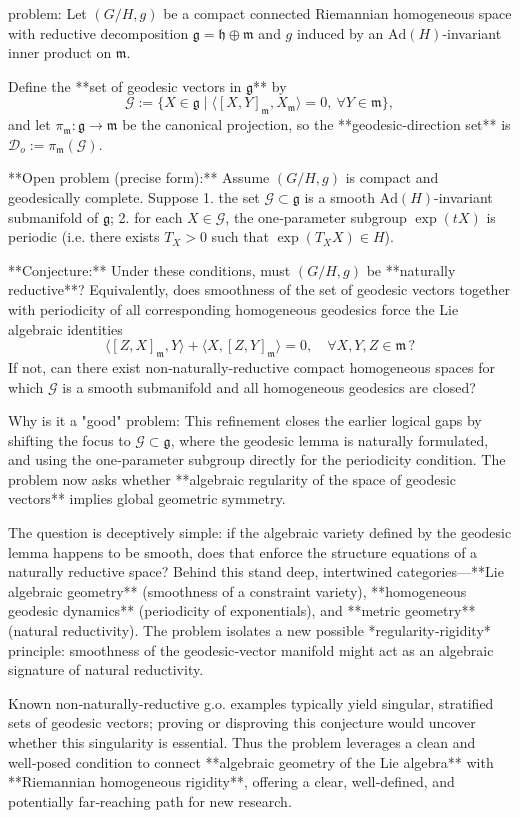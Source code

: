 problem:  
Let \( (G/H,g) \) be a compact connected Riemannian homogeneous space with reductive decomposition \( \mathfrak g = \mathfrak h \oplus \mathfrak m \) and \( g \) induced by an \( \mathrm{Ad}(H) \)-invariant inner product on \( \mathfrak m \).  

Define the **set of geodesic vectors in \(\mathfrak g\)** by  
\[
\mathcal{G} := \{ X\in \mathfrak g \mid \langle [X, Y]_{\mathfrak m}, X_{\mathfrak m}\rangle = 0,\ \forall Y\in \mathfrak m \},
\]
and let \(\pi_{\mathfrak m} : \mathfrak g \to \mathfrak m\) be the canonical projection, so the **geodesic‑direction set** is \(\mathcal{D}_o := \pi_{\mathfrak m}(\mathcal{G})\).  

**Open problem (precise form):**  
Assume \( (G/H,g) \) is compact and geodesically complete. Suppose  
1. the set \(\mathcal{G}\subset \mathfrak g\) is a smooth \(\mathrm{Ad}(H)\)-invariant submanifold of \(\mathfrak g\);  
2. for each \(X\in \mathcal{G}\), the one‑parameter subgroup \(\exp(tX)\) is periodic (i.e. there exists \(T_X>0\) such that \(\exp(T_X X)\in H\)).  

**Conjecture:**  
Under these conditions, must \( (G/H,g) \) be **naturally reductive**?  
Equivalently, does smoothness of the set of geodesic vectors together with periodicity of all corresponding homogeneous geodesics force the Lie algebraic identities  
\[
\langle [Z, X]_{\mathfrak m}, Y\rangle + \langle X, [Z,Y]_{\mathfrak m}\rangle = 0,\quad \forall X,Y,Z\in \mathfrak m\,?
\]
If not, can there exist non‑naturally‑reductive compact homogeneous spaces for which \(\mathcal{G}\) is a smooth submanifold and all homogeneous geodesics are closed?

Why is it a "good" problem:  
This refinement closes the earlier logical gaps by shifting the focus to \( \mathcal G\subset \mathfrak g\), where the geodesic lemma is naturally formulated, and using the one‑parameter subgroup directly for the periodicity condition. The problem now asks whether **algebraic regularity of the space of geodesic vectors** implies global geometric symmetry.  

The question is deceptively simple: if the algebraic variety defined by the geodesic lemma happens to be smooth, does that enforce the structure equations of a naturally reductive space? Behind this stand deep, intertwined categories—**Lie algebraic geometry** (smoothness of a constraint variety), **homogeneous geodesic dynamics** (periodicity of exponentials), and **metric geometry** (natural reductivity). The problem isolates a new possible *regularity‑rigidity* principle: smoothness of the geodesic‑vector manifold might act as an algebraic signature of natural reductivity.  

Known non‑naturally‑reductive g.o. examples typically yield singular, stratified sets of geodesic vectors; proving or disproving this conjecture would uncover whether this singularity is essential. Thus the problem leverages a clean and well‑posed condition to connect **algebraic geometry of the Lie algebra** with **Riemannian homogeneous rigidity**, offering a clear, well‑defined, and potentially far‑reaching path for new research.